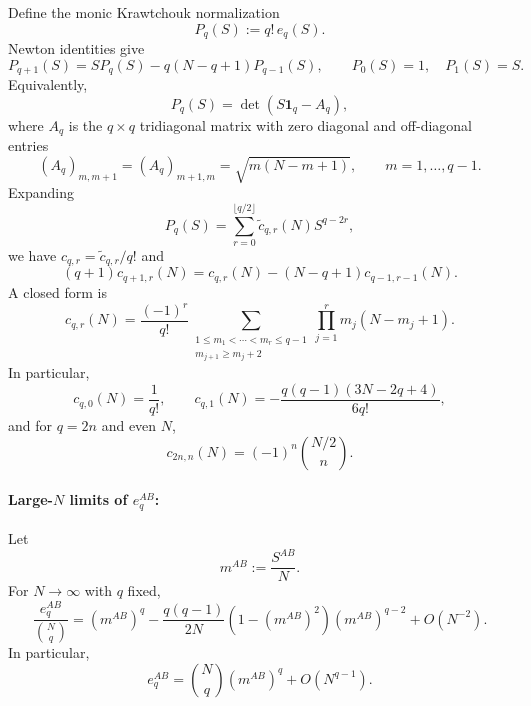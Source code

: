 \documentclass{article}
\theoremstyle{definition}
\begin{document}
Define the monic Krawtchouk normalization
\begin{equation}
    P_q(S):=q!\,e_q(S).
\end{equation}
Newton identities give
\begin{equation}
    P_{q+1}(S)
    =SP_q(S)-q(N-q+1)P_{q-1}(S),
    \qquad
    P_0(S)=1,\quad P_1(S)=S.
\end{equation}
Equivalently,
\begin{equation}
    P_q(S)=\det(S\mathbf 1_q-A_q),
\end{equation}
where $A_q$ is the $q\times q$ tridiagonal matrix with zero diagonal and
off-diagonal entries
\begin{equation}
    (A_q)_{m,m+1}=(A_q)_{m+1,m}
    =\sqrt{m(N-m+1)},
    \qquad m=1,\ldots,q-1.
\end{equation}
Expanding
\begin{equation}
    P_q(S)
    =\sum_{r=0}^{\lfloor q/2\rfloor}
    \widetilde c_{q,r}(N)S^{q-2r},
\end{equation}
we have $c_{q,r}=\widetilde c_{q,r}/q!$ and
\begin{equation}
    (q+1)c_{q+1,r}(N)
    =c_{q,r}(N)-(N-q+1)c_{q-1,r-1}(N).
\end{equation}
A closed form is
\begin{equation}
    c_{q,r}(N)
    =\frac{(-1)^r}{q!}
    \sum_{\substack{1\le m_1<\cdots<m_r\le q-1\\
                    m_{j+1}\ge m_j+2}}
    \prod_{j=1}^r m_j(N-m_j+1).
\end{equation}
In particular,
\begin{equation}
    c_{q,0}(N)=\frac1{q!},
    \qquad
    c_{q,1}(N)
    =-\frac{q(q-1)(3N-2q+4)}{6q!},
\end{equation}
and for $q=2n$ and even $N$,
\begin{equation}
    c_{2n,n}(N)=(-1)^n\binom{N/2}{n}.
\end{equation}

\paragraph{Large-$N$ limits of $e_q^{AB}$:} Let
\begin{equation}
    m^{AB}:=\frac{S^{AB}}{N}.
\end{equation}
For $N\to\infty$ with $q$ fixed,
\begin{equation}
    \frac{e_q^{AB}}{\binom Nq}
    =(m^{AB})^q
     -\frac{q(q-1)}{2N}
      (1-(m^{AB})^2)(m^{AB})^{q-2}
     +O(N^{-2}).
\end{equation}
In particular,
\begin{equation}
    e_q^{AB}
    =\binom Nq(m^{AB})^q+O(N^{q-1}).
\end{equation}
\end{document}

